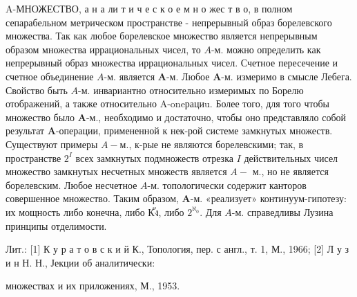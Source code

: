 \documentclass[10pt]{article}
\begin{document}
A-МНОЖЕСТВО, а н а ли т и ч е с к о е м н о жес т в о, в полном сепарабельном метрическом пространстве - непрерывный образ борелевского множества. Так как любое борелевское множество является непрерывным образом множества иррациональных чисел, то $A$-м. можно определить как непрерывный образ множества иррациональных чисел. Счетное пересечение и счетное объединение $A$-м. является $\boldsymbol{A}$-м. Любое $\boldsymbol{A}$-м. измеримо в смысле Лебега. Свойство быть $A$-м. инвариантно относительно измеримых по Борелю отображений, а также относительно A-oneрациu. Более того, для того чтобы множество было $\boldsymbol{A}$-м., необходимо и достаточно, чтобы оно представляло собой результат $\boldsymbol{A}$-операции, примененной к нек-рой системе замкнутых множеств. Существуют примеры $A-м .$, к-рые не являются борелевскими; так, в пространстве $2^{I}$ всех замкнутых подмножеств отрезка $I$ действительных чисел множество замкнутых несчетных множеств является $A-$ м., но не является борелевским. Любое несчетное $A$-м. топологически содержит канторов совершенное множество. Таким образом, $\boldsymbol{A}$-м. «реализует» континуум-гипотезу: их мощность либо конечна, либо Кัง, либо $2^{\aleph_{0}}$. Для $A$-м. справедливы Лузина принципы отделимости.



Лит.: [1] К у р а т о в с к и й К., Топология, пер. с англ., т. 1, М., 1966; [2] Л у з и н Н. Н., Јекции об аналитически:

множествах и их приложениях, М., 1953.
\end{document}
